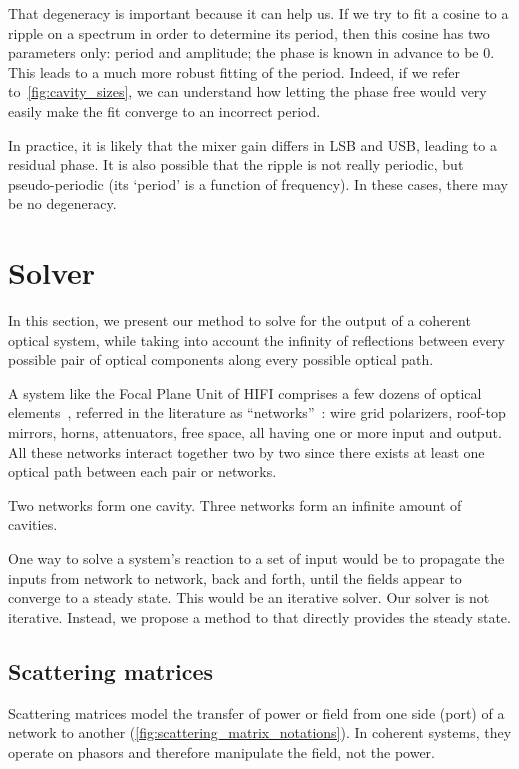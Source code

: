 That degeneracy is important because it can help us.
If we try to fit a cosine to a ripple on a spectrum in order to determine its period, then this cosine has two parameters only: period and amplitude; the phase is known in advance to be 0.
This leads to a much more robust fitting of the period.
Indeed, if we refer to~\cref{fig:cavity_sizes}, we can understand how letting the phase free would very easily make the fit converge to an incorrect period.

In practice, it is likely that the mixer gain differs in LSB and USB, leading to a residual phase.
It is also possible that the ripple is not really periodic, but pseudo-periodic (its `period' is a function of frequency).
In these cases, there may be no degeneracy.


\section{Solver}
\label{sec:chapter2_3}

In this section, we present our method to solve for the output of a coherent optical system, while taking into account the infinity of reflections between every possible pair of optical components along every possible optical path.

A system like the Focal Plane Unit of HIFI comprises a few dozens of optical elements~\cite{jackson2002hifi}, referred in the literature as ``networks''~\cite{siegman1986lasers}: wire grid polarizers, roof-top mirrors, horns, attenuators, free space, all having one or more input and output.
All these networks interact together two by two since there exists at least one optical path between each pair or networks.

Two networks form one cavity.  Three networks form an infinite amount of cavities.

One way to solve a system's reaction to a set of input would be to propagate the inputs from network to network, back and forth, until the fields appear to converge to a steady state.
This would be an iterative solver.
Our solver is not iterative.
Instead, we propose a method to that directly provides the steady state.


\subsection{Scattering matrices}
Scattering matrices \cite{siegman1986lasers} model the transfer of power or field from one side (port) of a network to another (\cref{fig:scattering_matrix_notations}).
In coherent systems, they operate on phasors and therefore manipulate the field, not the power.

